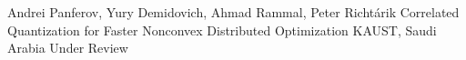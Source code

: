 
\begin{cventries}
  \cventry
    {Andrei Panferov, Yury Demidovich, Ahmad Rammal, Peter Richtárik} %
    {Correlated Quantization for Faster Nonconvex Distributed Optimization} %
    {KAUST, Saudi Arabia} %
    {Under Review} %
    {}

    
\end{cventries}
